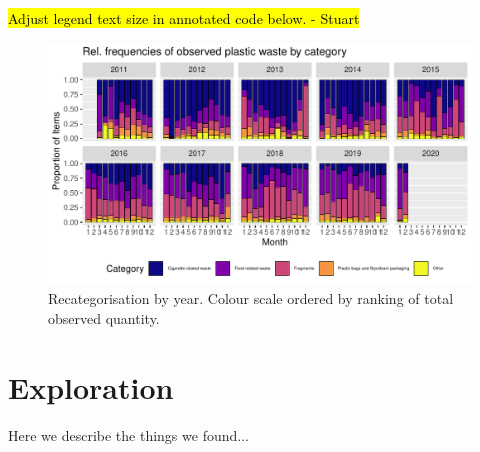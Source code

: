 \documentclass[10pt]{article}\usepackage[]{graphicx}\usepackage[]{color}
\newenvironment{knitrout}{}{} %
\begin{document}
\hl{Adjust legend text size in annotated code below. - Stuart}
\begin{figure}[H] %
\begin{center}
\begin{knitrout}
\color{fgcolor}
\includegraphics[width=1\linewidth]{figure/unnamed-chunk-8-1} 

\end{knitrout}
\caption {Recategorisation by year. Colour scale ordered by ranking of total observed quantity.}
\label{figB}
\end {center}
\end {figure}



\pagebreak
\section{Exploration}

Here we describe the things we found... 
\end{document}
